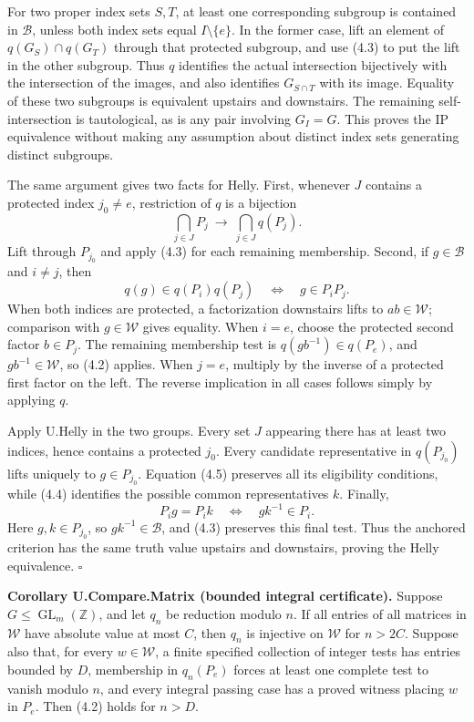 \documentclass[
  11pt,
  a4paper,
]{article}
\begin{document}
For two proper index sets \(S,T\), at least one corresponding subgroup
is contained in \(\mathcal B\), unless both index sets equal
\(I\setminus\{e\}\). In the former case, lift an element of
\(q(G_S)\cap q(G_T)\) through that protected subgroup, and use (4.3) to
put the lift in the other subgroup. Thus \(q\) identifies the actual
intersection bijectively with the intersection of the images, and also
identifies \(G_{S\cap T}\) with its image. Equality of these two
subgroups is equivalent upstairs and downstairs. The remaining
self-intersection is tautological, as is any pair involving \(G_I=G\).
This proves the IP equivalence without making any assumption about
distinct index sets generating distinct subgroups.

The same argument gives two facts for Helly. First, whenever \(J\)
contains a protected index \(j_0\ne e\), restriction of \(q\) is a
bijection \[
\bigcap_{j\in J}P_j\ \longrightarrow\
\bigcap_{j\in J}q(P_j).
\tag{4.4}
\] Lift through \(P_{j_0}\) and apply (4.3) for each remaining
membership. Second, if \(g\in\mathcal B\) and \(i\ne j\), then \[
q(g)\in q(P_i)q(P_j)\quad\Longleftrightarrow\quad g\in P_iP_j.
\tag{4.5}
\] When both indices are protected, a factorization downstairs lifts to
\(ab\in\mathcal W\); comparison with \(g\in\mathcal W\) gives equality.
When \(i=e\), choose the protected second factor \(b\in P_j\). The
remaining membership test is \(q(gb^{-1})\in q(P_e)\), and
\(gb^{-1}\in\mathcal W\), so (4.2) applies. When \(j=e\), multiply by
the inverse of a protected first factor on the left. The reverse
implication in all cases follows simply by applying \(q\).

Apply U.Helly in the two groups. Every set \(J\) appearing there has at
least two indices, hence contains a protected \(j_0\). Every candidate
representative in \(q(P_{j_0})\) lifts uniquely to \(g\in P_{j_0}\).
Equation (4.5) preserves all its eligibility conditions, while (4.4)
identifies the possible common representatives \(k\). Finally, \[
P_i g=P_i k\quad\Longleftrightarrow\quad gk^{-1}\in P_i.
\] Here \(g,k\in P_{j_0}\), so \(gk^{-1}\in\mathcal B\), and (4.3)
preserves this final test. Thus the anchored criterion has the same
truth value upstairs and downstairs, proving the Helly equivalence.
\(\square\)

\textbf{Corollary U.Compare.Matrix (bounded integral certificate).}
Suppose \(G\leq\operatorname{GL}_m(\mathbb Z)\), and let \(q_n\) be
reduction modulo \(n\). If all entries of all matrices in \(\mathcal W\)
have absolute value at most \(C\), then \(q_n\) is injective on
\(\mathcal W\) for \(n>2C\). Suppose also that, for every
\(w\in\mathcal W\), a finite specified collection of integer tests has
entries bounded by \(D\), membership in \(q_n(P_e)\) forces at least one
complete test to vanish modulo \(n\), and every integral passing case
has a proved witness placing \(w\) in \(P_e\). Then (4.2) holds for
\(n>D\).
\end{document}
